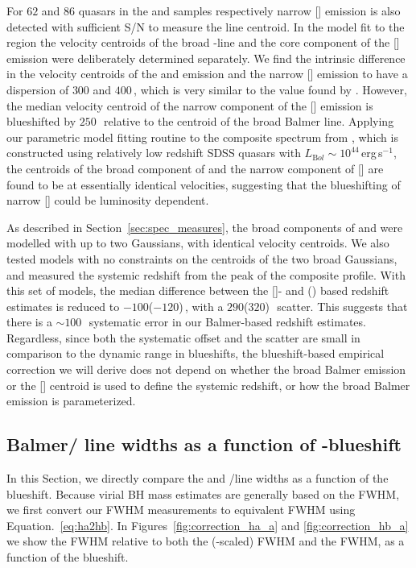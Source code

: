 For $62$ and $86$ quasars in the \ha and \hb samples respectively narrow [] emission is also detected with sufficient S/N to measure the line centroid. 
In the model fit to the \hb region the velocity centroids of the broad \hbns-line and the core component of the [] emission were deliberately determined separately.
We find the intrinsic difference in the velocity centroids of the \ha and \hb emission and the narrow [] emission to have a dispersion of $300$ and $400$\,\kms, which is very similar to the value found by \citet{shen16b}. 
However, the median velocity centroid of the narrow component of the [] emission is blueshifted by $250$\,\kms\, relative to the centroid of the broad Balmer line. 
Applying our parametric model fitting routine to the composite spectrum from \citet{hewett10}, which is constructed using relatively low redshift SDSS quasars with $L_{\mathrm Bol}\sim10^{44}$\,erg\,s$^{-1}$, the centroids of the broad component of \hb and the narrow component of [] are found to be at essentially identical velocities, suggesting that the blueshifting of narrow [] could be luminosity dependent.

As described in Section~\ref{sec:spec_measures}, the broad components of \ha and \hb were modelled with up to two Gaussians, with identical velocity centroids. 
We also tested models with no constraints on the centroids of the two broad Gaussians, and measured the systemic redshift from the peak of the composite profile. 
With this set of models, the median difference between the []- and \hans(\hbns) based redshift estimates is reduced to $-100$($-120$)\,\kms, with a $290$($320$)\,\kms\, scatter. 
This suggests that there is a $\sim100$\,\kms\, systematic error in our Balmer-based redshift estimates. 
Regardless, since both the systematic offset and the scatter are small in comparison to the dynamic range in  blueshifts, the blueshift-based empirical correction we will derive does not depend on whether the broad Balmer emission or the [] centroid is used to define the systemic redshift, or how the broad Balmer emission is parameterized. 

\subsection{Balmer/ line widths as a function of -blueshift}
\label{sec:correction}

In this Section, we directly compare the  and \hans/\hb line widths as a function of the  blueshift. 
Because virial BH mass estimates are generally based on the \hb FWHM, we first convert our \ha FWHM measurements to equivalent \hb FWHM using Equation.~\ref{eq:ha2hb}.  
In Figures~\ref{fig:correction_ha_a} and \ref{fig:correction_hb_a} we show the  FWHM relative to both the (\hbns-scaled) \ha FWHM and the \hb FWHM, as a function of the  blueshift. 

